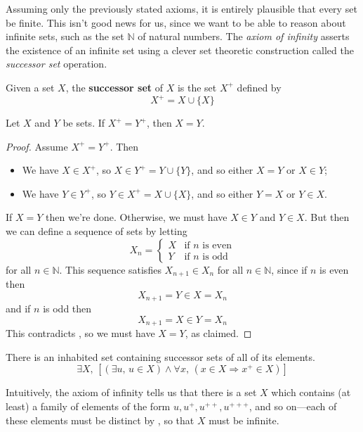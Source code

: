 Assuming only the previously stated axioms, it is entirely plausible that every set be finite. This isn't good news for us, since we want to be able to reason about infinite sets, such as the set $\mathbb{N}$ of natural numbers. The \textit{axiom of infinity} asserts the existence of an infinite set using a clever set theoretic construction called the \textit{successor set} operation.

\begin{definition}
\label{defSuccessorSet}
\label{successor set}
Given a set $X$, the \textbf{successor set} of $X$ is the set $X^+$ defined by
\[ X^+ = X \cup \{ X \} \]
\end{definition}

\begin{lemma}
\label{lemSuccessorSetIsInjective}
Let $X$ and $Y$ be sets. If $X^+ = Y^+$, then $X=Y$.
\end{lemma}

\begin{proof}
Assume $X^+=Y^+$. Then
\begin{itemize}
\item We have $X \in X^+$, so $X \in Y^+ = Y \cup \{ Y \}$, and so either $X = Y$ or $X \in Y$;
\item We have $Y \in Y^+$, so $Y \in X^+ = X \cup \{ X \}$, and so either $Y = X$ or $Y \in X$.
\end{itemize}
If $X=Y$ then we're done. Otherwise, we must have $X \in Y$ and $Y \in X$. But then we can define a sequence of sets by letting
\[ X_n = \begin{cases} X & \text{if } n \text{ is even} \\ Y & \text{if } n \text{ is odd} \end{cases} \]
for all $n \in \mathbb{N}$. This sequence satisfies $X_{n+1} \in X_n$ for all $n \in \mathbb{N}$, since if $n$ is even then
\[ X_{n+1} = Y \in X = X_n \]
and if $n$ is odd then
\[ X_{n+1} = X \in Y = X_n \]
This contradicts , so we must have $X=Y$, as claimed.
\end{proof}

\begin{axiom}
\label{axZFCInfinity}
There is an inhabited set containing successor sets of all of its elements.
\[ \exists X,\, [(\exists u,\, u \in X) \wedge \forall x,\, (x \in X \Rightarrow x^+ \in X)] \]
\end{axiom}

Intuitively, the axiom of infinity tells us that there is a set $X$ which contains (at least) a family of elements of the form $u, u^+, u^{++}, u^{+++}$, and so on---each of these elements must be distinct by , so that $X$ must be infinite.

